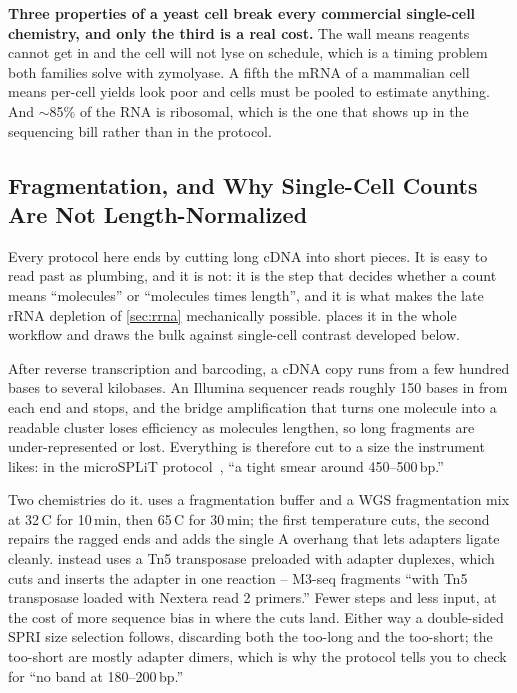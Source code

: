 \begin{keybox}
\textbf{Three properties of a yeast cell break every commercial single-cell
chemistry, and only the third is a real cost.} The wall means reagents cannot
get in and the cell will not lyse on schedule, which is a timing problem both
families solve with zymolyase. A fifth the mRNA of a mammalian cell means
per-cell yields look poor and cells must be pooled to estimate anything. And
$\sim$85\% of the RNA is ribosomal, which is the one that shows up in the
sequencing bill rather than in the protocol.
\end{keybox}

\subsection{Fragmentation, and Why Single-Cell Counts Are Not Length-Normalized}
\label{sec:fragmentation}

Every protocol here ends by cutting long cDNA into short pieces. It is easy to
read past as plumbing, and it is not: it is the step that decides whether a
count means ``molecules'' or ``molecules times length'', and it is what makes
the late rRNA depletion of \cref{sec:rrna} mechanically possible.
 places it in the whole workflow and draws the bulk against
single-cell contrast developed below.

 After reverse transcription and barcoding, a cDNA copy
runs from a few hundred bases to several kilobases. An Illumina sequencer reads
roughly 150 bases in from each end and stops, and the bridge amplification that
turns one molecule into a readable cluster loses efficiency as molecules
lengthen, so long fragments are under-represented or lost. Everything is
therefore cut to a size the instrument likes: in the microSPLiT
protocol~\citep{gaisserHighthroughputSinglecellTranscriptomics2024}, ``a tight
smear around 450--500\,bp.''

Two chemistries do it.  uses a fragmentation
buffer and a WGS fragmentation mix at 32\,\textdegree C for 10\,min, then
65\,\textdegree C for 30\,min; the first temperature cuts, the second repairs
the ragged ends and adds the single A overhang that lets adapters ligate
cleanly.  instead uses a Tn5 transposase preloaded with
adapter duplexes, which cuts and inserts the adapter in one reaction -- M3-seq
fragments ``with Tn5 transposase loaded with Nextera read 2 primers.'' Fewer
steps and less input, at the cost of more sequence bias in where the cuts land.
Either way a double-sided SPRI size selection follows, discarding both the
too-long and the too-short; the too-short are mostly adapter dimers, which is
why the protocol tells you to check for ``no band at 180--200\,bp.''

